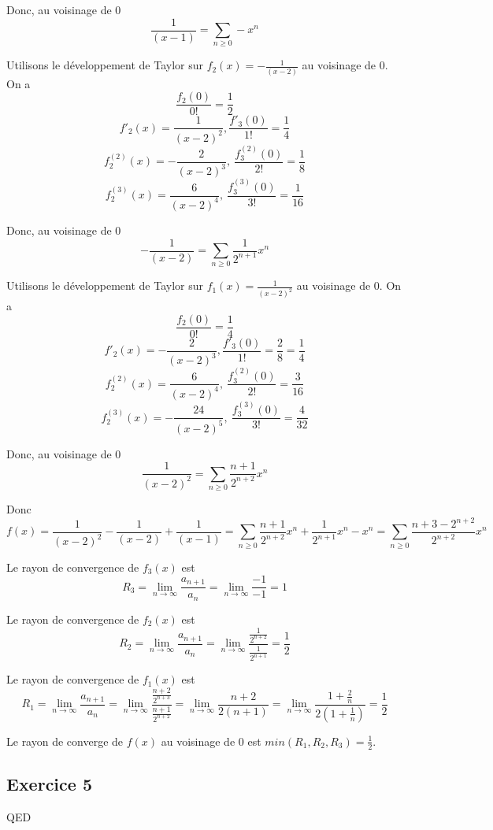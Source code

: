 \documentclass[]{book}
\theoremstyle{definition}
\begin{document}
Donc, au voisinage de 0
$$
\frac{1}{(x-1)} = \sum_{n \ge 0} -x^n
$$

Utilisons le d\'eveloppement de Taylor sur $f_2(x) = -\frac{1}{(x-2)}$ au voisinage de 0. On a 
$$\frac{f_2(0)}{0!} = \frac{1}{2}$$
$$f'_2(x) = \frac{1}{(x-2)^2}, \frac{f'_3(0)}{1!} = \frac{1}{4}$$
$$f^{(2)}_2(x) = -\frac{2}{(x-2)^3},\ \frac{f^{(2)}_3(0)}{2!} = \frac{1}{8}$$
$$f^{(3)}_2(x) = \frac{6}{(x-2)^4},\ \frac{f^{(3)}_3(0)}{3!} = \frac{1}{16}$$ 

Donc, au voisinage de 0
$$
-\frac{1}{(x-2)} = \sum_{n \ge 0} \frac{1}{2^{n+1}}x^n
$$

Utilisons le d\'eveloppement de Taylor sur $f_1(x) = \frac{1}{(x-2)^2}$ au voisinage de 0. On a 
$$\frac{f_2(0)}{0!} = \frac{1}{4}$$
$$f'_2(x) = -\frac{2}{(x-2)^3}, \frac{f'_3(0)}{1!} = \frac{2}{8} = \frac{1}{4}$$
$$f^{(2)}_2(x) = \frac{6}{(x-2)^4},\ \frac{f^{(2)}_3(0)}{2!} = \frac{3}{16}$$
$$f^{(3)}_2(x) = -\frac{24}{(x-2)^5},\ \frac{f^{(3)}_3(0)}{3!} = \frac{4}{32}$$ 

Donc, au voisinage de 0
$$
\frac{1}{(x-2)^2} = \sum_{n \ge 0} \frac{n+1}{2^{n+2}}x^n
$$

Donc 
$$
f(x) = \frac{1}{(x-2)^2} -\frac{1}{(x-2)} + \frac{1}{(x-1)} = \sum_{n \ge 0} \frac{n+1}{2^{n+2}}x^n + \frac{1}{2^{n+1}}x^n -x^n = \sum_{n \ge 0} \frac{n+3-2^{n+2}}{2^{n+2}}x^n
$$ 


Le rayon de convergence de $f_3(x)$ est 
$$R_3 = \lim_{n \to \infty} \frac{a_{n+1}}{a_n} = \lim_{n \to \infty} \frac{-1}{-1} = 1$$

Le rayon de convergence de $f_2(x)$ est 
$$R_2 = \lim_{n \to \infty} \frac{a_{n+1}}{a_n} = \lim_{n \to \infty} \frac{\frac{1}{2^{n+2}}}{\frac{1}{2^{n+1}}} = \frac{1}{2}$$

Le rayon de convergence de $f_1(x)$ est 
$$R_1 = \lim_{n \to \infty} \frac{a_{n+1}}{a_n} = \lim_{n \to \infty} \frac{\frac{n+2}{2^{n+3}}}{\frac{n+1}{2^{n+2}}} = \lim_{n \to \infty} \frac{n+2}{2(n+1)} = \lim_{n \to \infty} \frac{1+\frac{2}{n}}{2(1+\frac{1}{n})} = \frac{1}{2}$$

Le rayon de converge de $f(x)$ au voisinage de 0 est $min(R_1, R_2, R_3) = \frac{1}{2}$.

\subsection*{Exercice 5}


QED
\end{document}
